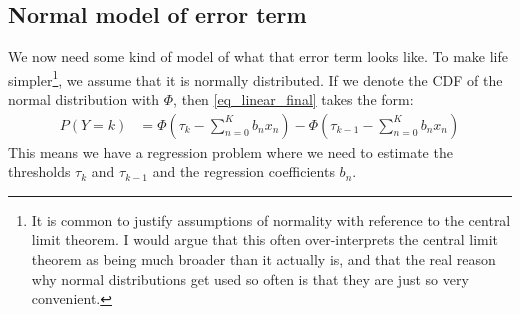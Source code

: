 \documentclass[10pt, twoside,a4paper]{article}
\begin{document}
\subsection{Normal model of error term}
We now need some kind of model of what that error term looks like. To make life simpler\footnote{It is common to justify assumptions of normality with reference to the central limit theorem. I would argue that this often over-interprets the central limit theorem as being much broader than it actually is, and that the real reason why normal distributions get used so often is that they are just so very convenient.}, we assume that it is normally distributed. If we denote the CDF of the normal distribution with $\Phi$, then \eqref{eq_linear_final} takes the form:
\begin{align}
P \left( Y = k \right) &=
\Phi \left( \tau_k - \sum_{n=0}^K b_n x_n \right) - \Phi \left( \tau_{k-1} - \sum_{n=0}^K b_n x_n \right)
\end{align}
This means we have a regression problem where we need to estimate the thresholds $\tau_k$ and $\tau_{k-1}$ and the regression coefficients $b_n$.
\end{document}
